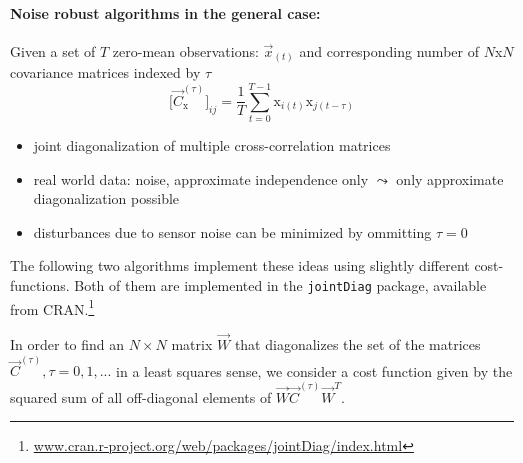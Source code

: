 \paragraph{Noise robust algorithms in the general case:}
Given a set of $T$ zero-mean observations: $\vec{x}_{(t)}$ and corresponding 
number of $N$x$N$ covariance matrices indexed by $\tau$ 
\begin{equation}
	\Big[\vec{C}_{\mathrm{x}}^{(\tau)}\Big]_{ij} = 
	\frac{1}{T} \sum\limits_{t = 0}^{T-1} \mathrm{x}_{i(t)}
	\mathrm{x}_{j(t-\tau)}
\end{equation}
\begin{itemize}
	\item joint diagonalization of multiple cross-correlation matrices
	\item real world data: noise, approximate independence only
	$\leadsto$ only approximate diagonalization possible
	\item disturbances due to sensor noise can be minimized by ommitting $\tau = 0$
\end{itemize}
The following two algorithms implement these ideas using slightly different cost-functions. Both of them are implemented in the \texttt{jointDiag} package, available from CRAN.\footnote{\url{www.cran.r-project.org/web/packages/jointDiag/index.html}}

In order to find an $N \times N$ matrix $\vec{W}$ that diagonalizes the set of the matrices $\vec{C}^{(\tau)}, \tau = 0, 1, ...$ in a
least squares sense, we consider a cost function given by the squared sum of all off-diagonal elements
of $\vec{W} \vec{C}^{(\tau)} \vec{W}^T$. 


